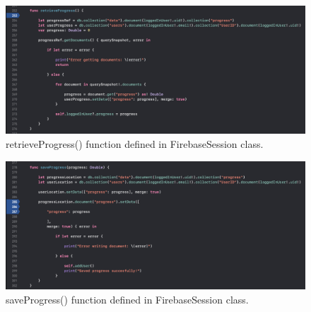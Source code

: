 \begin{figure}[H]
    \centering
    \includegraphics[width=\textwidth]{./graphics/Implementation/Dashboard/firebasesession4.png}
    \caption{retrieveProgress() function defined in FirebaseSession class.}
    \label{fig:firebasesession4_dashboard}
\end{figure}

\begin{figure}[H]
    \centering
    \includegraphics[width=\textwidth]{./graphics/Implementation/Dashboard/firebasesession5.png}
    \caption{saveProgress() function defined in FirebaseSession class.}
    \label{fig:firebasesession5_dashboard}
\end{figure}

